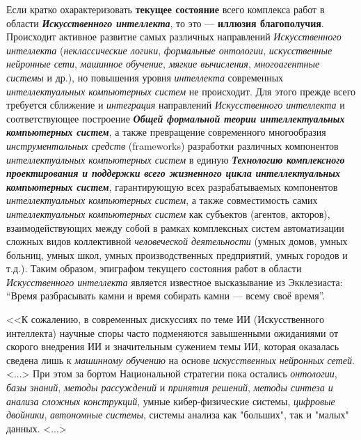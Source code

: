 Если кратко охарактеризовать \textbf{текущее состояние} всего комплекса работ в области \textbf{\textit{Искусственного интеллекта}}, то это --- \textbf{иллюзия благополучия}. Происходит активное  развитие самых различных направлений \textit{Искусственного интеллекта} (\textit{неклассические логики}, \textit{формальные онтологии}, \textit{искусственные нейронные сети}, \textit{машинное обучение}, \textit{мягкие вычисления}, \textit{многоагентные системы} и др.), но  повышения уровня \textit{интеллекта} современных \textit{интеллектуальных компьютерных систем} не происходит. Для этого прежде всего требуется сближение и \textit{интеграция}  направлений \textit{Искусственного интеллекта} и соответствующее построение \textbf{\textit{Общей формальной теории интеллектуальных компьютерных систем}}, а также превращение современного многообразия \textit{инструментальных средств} (frameworks) разработки различных компонентов \textit{интеллектуальных компьютерных систем} в единую \textbf{\textit{Технологию комплексного проектирования и поддержки всего жизненного цикла интеллектуальных компьютерных систем}}, гарантирующую  всех разрабатываемых компонентов \textit{интеллектуальных компьютерных систем}, а также совместимость самих \textit{интеллектуальных компьютерных систем} как  субъектов (агентов, акторов), взаимодействующих между собой в рамках комплексных систем автоматизации сложных видов коллективной \textit{человеческой деятельности} (умных домов, умных больниц, умных школ, умных производственных предприятий, умных городов и т.д.). Таким образом, эпиграфом текущего состояния работ в области \textit{Искусственного интеллекта} является известное высказывание из Экклезиаста: ``Время разбрасывать камни и время собирать камни --- всему своё время''.

<<К сожалению, в современных дискуссиях по теме ИИ (Искусственного интеллекта) научные споры часто подменяются завышенными ожиданиями от скорого внедрения ИИ и значительным сужением темы ИИ, которая оказалась сведена лишь к \textit{машинному обучению} на основе \textit{искусственных нейронных сетей}. <...> При этом за бортом Национальной стратегии пока остались \textit{онтологии}, \textit{базы знаний}, \textit{методы рассуждений} и \textit{принятия решений}, \textit{методы синтеза и} \textit{анализа сложных конструкций}, умные кибер-физические системы, \textit{цифровые двойники}, \textit{автономные системы}, системы анализа как "больших"{}, так и "малых"{} данных. <...>

